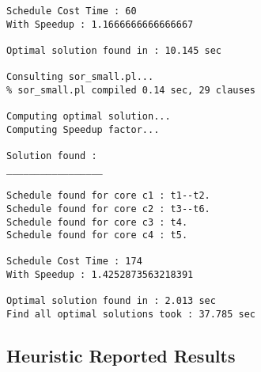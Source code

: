 \documentclass[11pt, a4paper, margin = 1.3cm]{article}
\begin{document}
\begin{verbatim}
Schedule Cost Time : 60
With Speedup : 1.1666666666666667

Optimal solution found in : 10.145 sec

Consulting sor_small.pl...
% sor_small.pl compiled 0.14 sec, 29 clauses

Computing optimal solution...
Computing Speedup factor...

Solution found : 
_________________

Schedule found for core c1 : t1--t2.
Schedule found for core c2 : t3--t6.
Schedule found for core c3 : t4.
Schedule found for core c4 : t5.

Schedule Cost Time : 174
With Speedup : 1.4252873563218391

Optimal solution found in : 2.013 sec
Find all optimal solutions took : 37.785 sec
\end{verbatim}

\subsection{Heuristic Reported Results}
\end{document}
